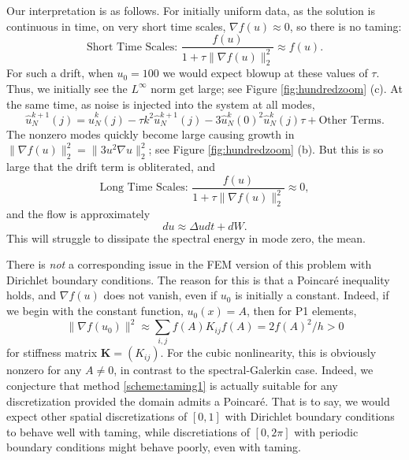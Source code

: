 \documentclass[reqno, 11pt]{amsart}
\theoremstyle{plain}
\theoremstyle{definition}
\theoremstyle{remark}
\numberwithin{equation}{section}
\numberwithin{theorem}{section}
\begin{document}
{Our interpretation is as follows.  For initially uniform data, as the solution is continuous in time, on very short time scales, $\nabla f(u)\approx 0$, so there is no taming:
\begin{equation}
    \text{Short Time Scales: }\frac{f(u)}{1 + \tau \|\nabla f(u)\|_2^2}\approx {f(u)}.
\end{equation}
For such a drift, when $u_0 = 100$ we would expect blowup at these values of $\tau$.  Thus, we initially see the $L^\infty$ norm get large; see Figure \ref{fig:hundredzoom} (c).  At the same time, as noise is injected into the system at all modes, 
\begin{equation*}
    \hat{u}_N^{k+1}(j) = \hat{u}_N^k(j) - \tau k^2 \hat{u}^{k+1}_N(j) - 3 \hat{u}_N^k(0)^2 \hat{u}^k_N(j)\tau +\text{Other Terms}.
\end{equation*}
The nonzero modes quickly become large causing growth in $\|\nabla f(u)\|_2^2 = \|3u^2 \nabla u\|_2^2$; see Figure \ref{fig:hundredzoom} (b).  But this is so large that the drift term is obliterated, and
\begin{equation}
    \text{Long Time Scales: }\frac{f(u)}{1 + \tau \|\nabla f(u)\|_2^2}\approx 0,
\end{equation}
and the flow is approximately
\begin{equation*}
    du \approx \Delta u dt + dW.
\end{equation*}
This will struggle to dissipate the spectral energy in mode zero, the mean.



There is {\it not} a corresponding issue in the FEM version of this problem with Dirichlet boundary conditions.  The reason for this is that a Poincaré inequality holds, and $\nabla f(u)$ does not vanish, even if $u_0$ is initially a constant.    Indeed, if we begin with the constant function, $u_0(x) = A$, then for P1 elements,
\begin{equation}
    \|\nabla f(u_0)\|^2 \approx\sum_{i,j}f(A) K_{ij} f(A) = 2 {f(A)^2}/{h}>0
\end{equation}
for stiffness matrix $\mathbf{K} = (K_{ij})$.  For the cubic nonlinearity, this is obviously nonzero for any $A\neq 0$, in contrast to the spectral-Galerkin case.  Indeed, we conjecture that method \eqref{scheme:taming1} is actually suitable for any discretization provided the domain admits a Poincaré. That is to say, we would expect other spatial discretizations of $[0,1]$ with Dirichlet boundary conditions to behave well with taming, while discretiations of $[0,2\pi]$ with periodic boundary conditions might behave poorly, even with taming.

}
\end{document}
